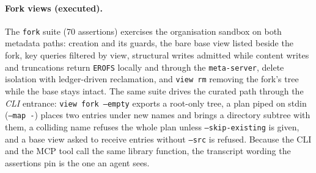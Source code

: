 \documentclass[numberedsection,acmtos]{acmart}
\begin{document}
\paragraph{Fork views (executed).} The \texttt{fork} suite (70 assertions)
exercises the organisation sandbox on both metadata paths: creation and its
guards, the bare base view listed beside the fork, key queries filtered by
view, structural writes admitted while content writes and truncations return
\texttt{EROFS} locally and through the \texttt{meta-server}, delete isolation
with ledger-driven reclamation, and \texttt{view rm} removing the fork's tree
while the base stays intact. The same suite drives the curated path through the
\emph{CLI} entrance: \texttt{view fork --empty} exports a root-only tree, a
plan piped on stdin (\texttt{--map -}) places two entries under new names and
brings a directory subtree with them, a colliding name refuses the whole plan
unless \texttt{--skip-existing} is given, and a base view asked to receive
entries without \texttt{--src} is refused. Because the CLI and the MCP tool
call the same library function, the transcript wording the assertions pin is
the one an agent sees.
\end{document}
